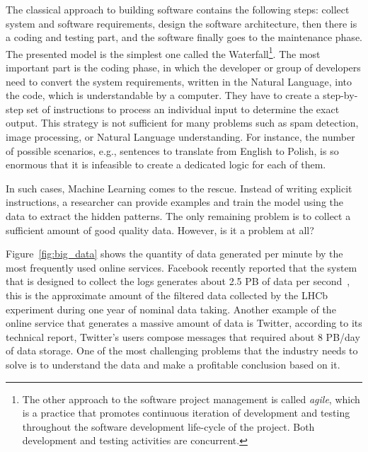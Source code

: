 The classical approach to building software contains the following steps: collect system and software requirements,
design the software architecture, then there is a coding and testing part, and the software finally goes to the maintenance phase. The presented model is the simplest one called the Waterfall\footnote{The other approach to the software project management is called \textit{agile}, which is a practice that promotes continuous iteration of development and testing throughout the software development life-cycle of the project. Both development and testing activities are concurrent.}. The most important part is the coding phase, in which the developer or group of developers need to convert the system requirements, written in the Natural Language, into the code, which is understandable by a computer. They have to create a step-by-step set of instructions to process an individual input to determine the exact output. 
This strategy is not sufficient for many problems such as spam detection, image processing, or Natural Language understanding. For instance, the number of possible scenarios, e.g., sentences to translate from English to Polish, is so enormous that it is infeasible to create a dedicated logic for each of them. 

In such cases, Machine Learning comes to the rescue. Instead of writing explicit instructions, a researcher can provide examples and train the model using the data to extract the hidden patterns. The only remaining problem is to collect a sufficient amount of good quality data. However, is it a problem at all? 

Figure~\ref{fig:big_data} shows the quantity of data generated per minute by the most frequently used online services. Facebook recently reported that the system that is designed to collect the logs generates about 2.5 PB of data per second~\cite{facebook}, this is the approximate amount of the filtered data collected by the LHCb experiment during one year of nominal data taking. Another example of the online service that generates a massive amount of data is Twitter, according to its technical report, Twitter's users compose messages that required about 8 PB/day of data storage. One of the most challenging problems that the industry needs to solve is to understand the data and make a profitable conclusion based on it.

